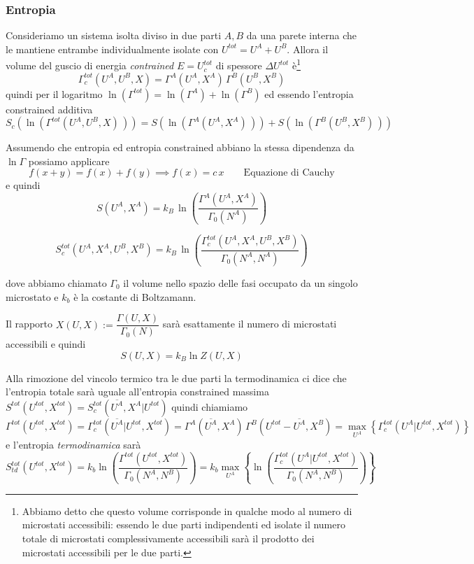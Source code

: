 \documentclass[11pt,a4paper,twoside]{book}
\numberwithin{equation}{section} %
\begin{document}
\subsubsection{Entropia}

Consideriamo un sistema isolta diviso in due parti $A,B$ da una parete interna che le mantiene entrambe individualmente isolate con $U^{tot}=U^A+U^B$.
Allora il volume del guscio di energia \textit{contrained} $E=U_c^{tot}$ di spessore $\Delta U^{tot}$ è\footnote{Abbiamo detto che questo volume corrisponde in qualche modo al numero di microstati accessibili: essendo le due parti indipendenti ed isolate il numero totale di microstati complessivamente accessibili sarà il prodotto dei microstati accessibili per le due parti.}
\begin{equation}\label{volumeGuscioComposto}
\Gamma^{tot}_c(U^A,U^B,X)=\Gamma^A(U^A,X^A)\,\Gamma^B(U^B,X^B)
\end{equation}
quindi per il logaritmo $\ln(\Gamma^{tot})=\ln(\Gamma^A)+\ln(\Gamma^B)$ ed essendo l'entropia constrained additiva 
\[
S_c(\ln(\Gamma^{tot}(U^A,U^B,X)\,))=S(\ln(\Gamma^A(U^A,X^A)\,))+S(\ln(\Gamma^B(U^B,X^B)\,))
\]

Assumendo che entropia ed entropia constrained abbiano la stessa dipendenza da $\ln\Gamma$ possiamo applicare
\[
f(x+y)=f(x)+f(y)\implies f(x)=c\,x \qquad \text{Equazione di Cauchy}
\]
e quindi
\begin{equation}
S(U^A,X^A)=k_B\,\ln\left( \dfrac{\Gamma^A(U^A,X^A)}{\Gamma_0(N^A)} \right)
\end{equation}

\begin{equation}
S_c^{tot}(U^A,X^A,U^B,X^B)=k_B\,\ln\left( \dfrac{\Gamma_c^{tot}(U^A,X^A,U^B,X^B)}{\Gamma_0(N^A,N^A)} \right)
\end{equation}

dove abbiamo chiamato $\Gamma_0$ il volume nello spazio delle fasi occupato da un singolo microstato e $k_b$ è la costante di Boltzamann.

Il rapporto $X(U,X):=\dfrac{\Gamma(U,X)}{\Gamma_0(N)}$ sarà esattamente il numero di microstati accessibili e quindi
\begin{equation} 
S(U,X)=k_B \ln Z(U,X)
\end{equation}

Alla rimozione del vincolo termico tra le due parti la termodinamica ci dice che l'entropia totale sarà uguale all'entropia constrained massima $S^{tot}(U^{tot},X^{tot})=S_c^{tot}(\overline{U^A},X^A|U^{tot})$ quindi chiamiamo
\[
\Gamma^{tot}(U^{tot},X^{tot})=\Gamma_c^{tot}(\overline{U^A}|U^{tot},X^{tot})=\Gamma^A(\overline{U^A},X^A)\,\Gamma^B(U^{tot}-\overline{U^A},X^B)=\max_{U^A}\left\{\Gamma_c^{tot}(U^A|U^{tot},X^{tot})\right\}
\]
e l'entropia \textit{termodinamica} sarà
\begin{equation}
S_{td}^{tot}(U^{tot},X^{tot})= k_b\ln\left( \dfrac{\Gamma^{tot}(U^{tot},X^{tot})}{\Gamma_0(N^A,N^B)} \right)=k_b\max_{U^A}\left\{ \ln\left( \dfrac{\Gamma_c^{tot}(U^A|U^{tot},X^{tot})}{\Gamma_0(N^A,N^B)} \right)\right\}
\end{equation}
\end{document}
